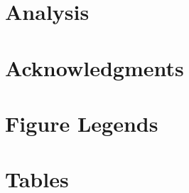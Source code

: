 \documentclass[10pt]{article}
\begin{document}
\section*{Analysis}

\section*{Acknowledgments}




\section*{Figure Legends}


\section*{Tables}
\end{document}
